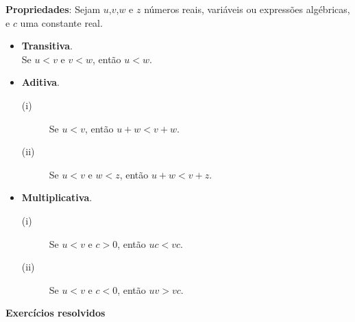 	

    \noindent
	\textbf{Propriedades}:
	Sejam $u$,$v$,$w$ e $z$ números reais, variáveis ou expressões algébricas, e $c$ uma constante real.
	\begin{itemize}
		\item \textbf{Transitiva}.\\
            Se  $u < v$ e $v < w$, então $u < w$.
		\item \textbf{Aditiva}. 
            \begin{description}
                \item[(i)]  Se  $u < v$, então $u + w < v +w$.
		      \item[(ii)] Se  $u < v$ e $w < z$, então $u + w < v +z$.
            \end{description}
		\item \textbf{Multiplicativa}. 
            \begin{description}
                \item[(i)]  Se  $u < v$ e $c > 0$, então $uc < vc$.
		      \item[(ii)] Se  $u < v$ e $c < 0$, então $uv > vc$.
            \end{description}
	\end{itemize}

    \noindent
	\textbf{Exercícios resolvidos}

